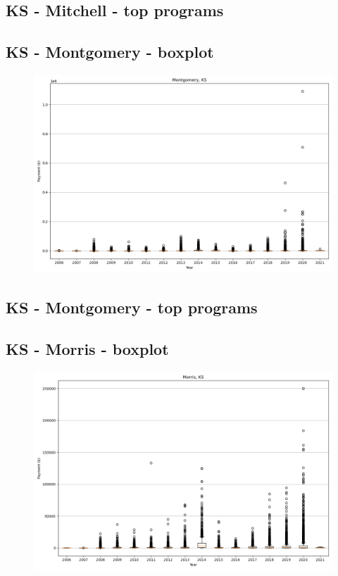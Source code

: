 \subsection*{KS - Mitchell - top programs}

\newpage
\subsection*{KS - Montgomery - boxplot}
\begin{figure}[h]
\centering
\includegraphics[width=7in]{../output/boxplots/counties/Montgomery-KS_boxplot.png}
\end{figure}


\subsection*{KS - Montgomery - top programs}

\newpage
\subsection*{KS - Morris - boxplot}
\begin{figure}[h]
\centering
\includegraphics[width=7in]{../output/boxplots/counties/Morris-KS_boxplot.png}
\end{figure}


